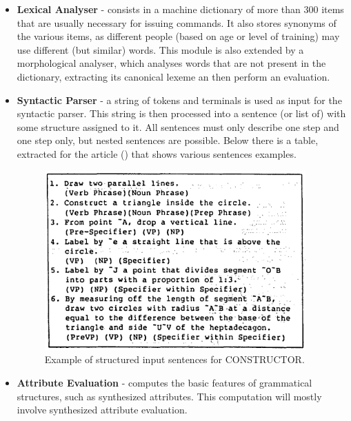 \begin{itemize}
\item \textbf{Lexical Analyser} - consists in a machine dictionary of more than 300 items that are usually necessary for issuing commands.
It also stores synonyms of the various items, as different people (based on age or level of training) may use different (but similar) words.
This module is also extended by a morphological analyser, which analyses words that are not present in the dictionary,
extracting its canonical lexeme an then perform an evaluation.

\item \textbf{Syntactic Parser} - a string of tokens and terminals is used as input for the syntactic parser.
This string is then processed into a sentence (or list of) with some structure assigned to it.
All sentences must only describe one step and one step only, but nested sentences are possible.
Below there is a table, extracted for the article (\cite{alexin_1990}) that shows various sentences examples.
\begin{figure}[h]
\centering
\includegraphics[width=10cm]{images/constructor_sentence_struct.png}
\caption{Example of structured input sentences for CONSTRUCTOR.}
\label{fig:constructorSentenceStruct}
\end{figure}

\item \textbf{Attribute Evaluation} - computes the basic features of grammatical structures, such as synthesized attributes.
This computation will mostly involve synthesized attribute evaluation.


\end{itemize}
